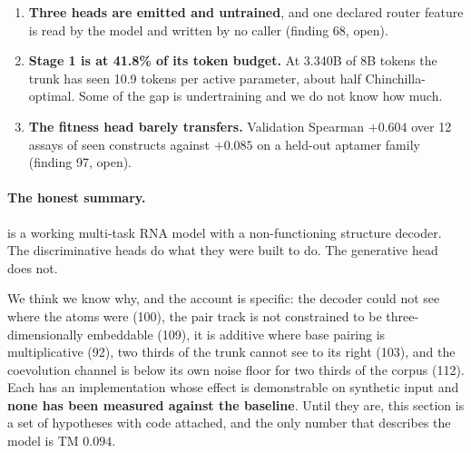 \documentclass[11pt,a4paper]{article}
\begin{document}
\begin{enumerate}
\item \textbf{Three heads are emitted and untrained}, and one declared
  router feature is read by the model and written by no caller
  (finding 68, open).

\item \textbf{Stage 1 is at 41.8\% of its token budget.} At 3.340B of
  8B tokens the trunk has seen 10.9 tokens per active parameter, about
  half Chinchilla-optimal. Some of the gap is undertraining and we do not
  know how much.

\item \textbf{The fitness head barely transfers.} Validation Spearman
  $+0.604$ over 12 assays of seen constructs against $+0.085$ on a
  held-out aptamer family (finding 97, open).
\end{enumerate}

\paragraph{The honest summary.} \pharos{} is a working multi-task RNA
model with a non-functioning structure decoder. The discriminative heads
do what they were built to do. The generative head does not.

We think we know why, and the account is specific: the decoder could not
see where the atoms were (100), the pair track is not constrained to be
three-dimensionally embeddable (109), it is additive where base pairing
is multiplicative (92), two thirds of the trunk cannot see to its right
(103), and the coevolution channel is below its own noise floor for two
thirds of the corpus (112). Each has an implementation whose effect is
demonstrable on synthetic input and \textbf{none has been measured
against the baseline}. Until they are, this section is a set of
hypotheses with code attached, and the only number that describes the
model is TM $0.094$.
\end{document}
